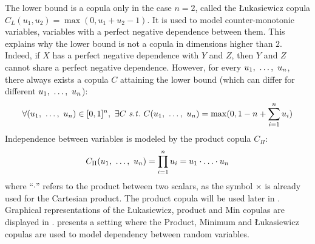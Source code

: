 The lower bound is a copula only in the case $n=2$, called the \L ukasiewicz copula $C_L(u_1,u_2)=\max(0,u_1+u_2-1)$. It is used to model counter-monotonic variables, \ie variables with a perfect negative dependence between them. This explains why the lower bound is not a copula in dimensions higher than $2$. Indeed, if $X$ has a perfect negative dependence with $Y$ and $Z$, then $Y$ and $Z$ cannot share a perfect negative dependence. However, for every $u_1, ~\ldots, ~ u_n$, there always exists a copula $C$ attaining the lower bound (which can differ for different $u_1, ~\ldots, ~ u_n$):
\begin{eqnarray*}
    \forall (u_1\enum u_n)\in[0,1]^n,~\exists C \text{ \st }~C(u_1\enum u_n) = \max(0, 1-n+\sum_{i=1}^n u_i)
\end{eqnarray*}
Independence between variables is modeled by the product copula $C_\Pi$:
\begin{equation*}
    C_\Pi(u_1, ~\ldots, ~ u_n)=\prod_{i=1}^n u_i = u_1\cdot\ldots\cdot u_n
\end{equation*}
where ``$\cdot$'' refers to the product between two scalars, as the symbol $\times$ is already used for the Cartesian product. The product copula will be used later in . Graphical representations of the \L ukasiewicz, product and Min copulas are displayed in .  presents a setting where the Product, Minimum and \L ukasiewicz copulas are used to model dependency between random variables.

